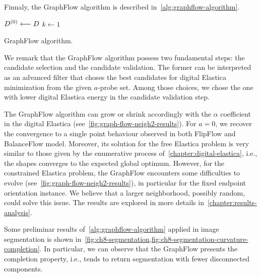 Finnaly, the GraphFlow algorithm is described in~\cref{alg:graphflow-algorithm}.


\begin{algorithm}
 
 \BlankLine
 $D^{(0)} \longleftarrow D$\;
 $k \longleftarrow 1$\;
 \caption{GraphFlow algorithm.}
 \label{alg:graphflow-algorithm}  
\end{algorithm}

We remark that the GraphFlow algorithm possess two fundamental steps: the candidate selection and the candidate validation. The former can be interpreted as an advanced filter that choses the best candidates for digital Elastica minimization from the given $a$-probe set. Among those choices, we chose the one with lower digital Elastica energy in the candidate validation step.

The GraphFlow algorithm can grow or shrink accordingly with the $\alpha$ coefficient in the digital Elastica (see~\cref{fig:graph-flow-neigh2-results}). For $a=0$, we recover the convergence to a single point behaviour observed in both FlipFlow and BalanceFlow model. Moreover, its solution for the free Elastica problem is very similar to those given by the enumerative process of~\cref{chapter:digital-elastica}, i.e., the shapes converges to the expected global optimum. However, for the constrained Elastica problem, the GraphFlow encounters some difficulties to evolve (see~\cref{fig:graph-flow-neigh2-results}), in particular for the fixed endpoint orientation instance. We believe that a larger neighborhood, possibly random, could solve this issue. The results are explored in more details in~\cref{chapter:results-analysis}.

Some preliminar results of~\cref{alg:graphflow-algorithm} applied in image segmentation is shown in~\cref{fig:ch8-segmentation,fig:ch8-segmentation-curvature-completion}. In particular, we can observe that the GraphFlow presents the completion property, i.e., tends to return segmentation with fewer disconnected components.

